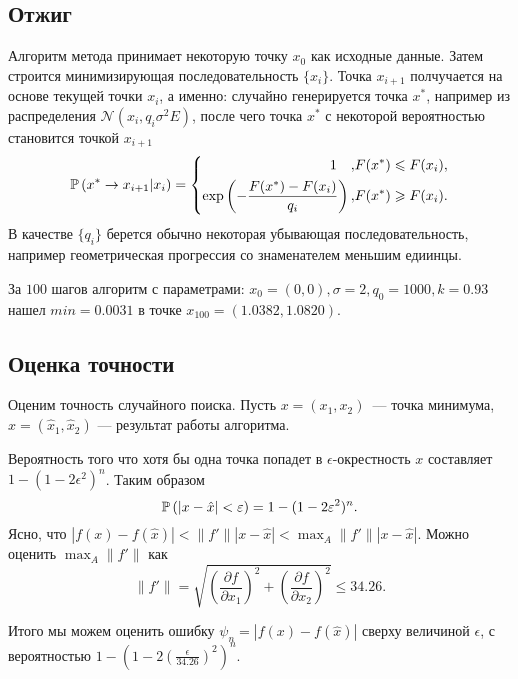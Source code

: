 \subsection{Отжиг}
        Алгоритм метода принимает некоторую точку $x_0$ как исходные данные. 
        Затем строится минимизирующая последовательность $\{x_i\}$. Точка $x_{i+1}$ 
        полчучается на основе текущей точки $x_i$, а именно: случайно 
        генерируется точка $x^*$, например из распределения 
        $\mathcal{N}(x_i,q_i\sigma^2 E)$, после чего точка $x^*$ с некоторой вероятностью
        становится точкой $x_{i+1}$
        \begin{equation*}
            \mathbb{P}\left(x^* \rightarrow x_{i+1} | x_i\right) = 
            \left\{\begin{aligned}
                1\quad, & F(x^*) \leqslant F(x_i),\\
                \exp\left(-\frac{F(x^*)-F(x_i)}{q_i}\right),& F(x^*) \geqslant F(x_i).
            \end{aligned}\right.
        \end{equation*}
        В качестве $\{q_i\}$ берется обычно некоторая убывающая 
        последовательность, например геометрическая прогрессия со знаменателем 
        меньшим едиинцы.

        За $100$ шагов алгоритм с параметрами: $x_0 = (0,0), \sigma = 2, 
        q_0 = 1000, k = 0.93$ нашел $min = 0.0031$ в точке $x_{100} = 
        (1.0382, 1.0820)$.

\subsection{Оценка точности}
    Оценим точность случайного поиска. Пусть $x = (x_1, x_2)$~--- точка 
    минимума, $\hat{x} = (\hat{x}_1, \hat{x}_2)$ --- результат работы алгоритма.

    Вероятность того что хотя бы одна точка попадет в $\epsilon$-окрестность $x$ 
    составляет $1 - (1-2\epsilon^2)^n$. Таким образом
    \begin{equation*}
        \mathbb{P}\left(|x - \hat x| < \varepsilon\right) = 1 - (1-2\varepsilon^2)^n.
    \end{equation*}
    Ясно, что $|f(x) - f(\hat x)| < \|f'\||x - \hat{x}| < 
    \max_A \|f'\| |x - \hat{x}|$.
    Можно оценить $\max_A \|f'\|$ как
    \begin{equation*}
        \|f'\| = \sqrt{\left(\frac{\partial f}{\partial x_1}\right)^2 
        + \left(\frac{\partial f}{\partial x_2}\right)^2} \le  34.26.
    \end{equation*}

    Итого мы можем оценить ошибку $\psi_n = |f(x) - f(\hat x)|$ сверху величиной 
    $\epsilon$, с вероятностью $1 - (1-2(\frac{\epsilon}{34.26})^2)^n$.